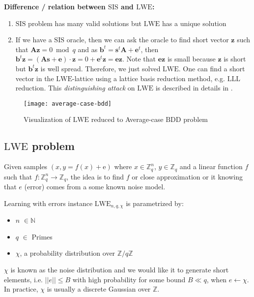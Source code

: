 \textbf{Difference / relation between $\mathrm{SIS}$ and $\mathrm{LWE}$:}

\begin{enumerate}
    \item $\mathrm{SIS}$ problem has many valid solutions but $\mathrm{LWE}$ has a unique solution
    \item If we have a $\mathrm{SIS}$ oracle, then we can ask the oracle to find short vector $\textbf{z}$ such that $\textbf{A} \textbf{z} = 0 \bmod q$ and as $\textbf{b}^t = \textbf{s}^t\textbf{A} + \textbf{e}^t$, then $\textbf{b}^t \textbf{z} = (\textbf{A}\textbf{s} + \textbf{e}) \cdot \textbf{z} = 0 + \textbf{e}^t \textbf{z} = \textbf{e}\textbf{z}$. Note that $\textbf{e}\textbf{z}$ is small because $\textbf{z}$ is short but $\textbf{b}^t \textbf{z}$ is well spread. Therefore, we just solved $\mathrm{LWE}$. One can find a short vector in the $\mathrm{LWE}$-lattice using a lattice basis reduction method, e.g. $\mathrm{LLL}$ reduction. This \textit{distinguishing attack} on $\mathrm{LWE}$ is described in details in \cite{Lindner:2011:BKS:1964621.1964651}.
\end{enumerate}




\begin{figure}[H]
\centering
\texttt{[image: average-case-bdd]}
\caption{Visualization of $\mathrm{LWE}$ reduced to Average-case $\mathrm{BDD}$ problem}
\end{figure}



 



\subsection{\texorpdfstring{$\mathrm{LWE}$}{LWE} problem}
Given samples $(x,y = f(x) + \mathrm{e})$ where $x \in {\mathbb{Z}}_{q}^{n}$, $y \in {\mathbb{Z}}_{q}$ and a linear function $f$ such that $f: {\mathbb{Z}}_{q}^{n} \to {\mathbb{Z}}_{q}$, the idea is to find $f$ or close approximation or it knowing that $e$ (error) comes from a some known noise model. 

\begin{definition}
\normalfont
Learning with errors instance $\mathrm{LWE}_{n,q,\chi}$ is parametrized by:

\begin{itemize}
\item $n$ $\in \mathbb{N}$
\item $q$ $\in$ Primes
\item $\chi$, a probability distribution over $\mathbb{Z}/q\mathbb{Z}$
\end{itemize}

$\chi$ is known as the noise distribution and we would like it to generate short elements, i.e. $||e|| \leq B$ with high probability for some bound $B \ll q$, when $e \leftarrow \chi$. In practice, $\chi$ is usually a discrete Gaussian over $\mathbb{Z}$.
\end{definition}


